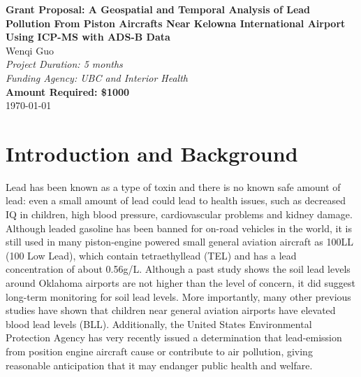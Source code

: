 \documentclass[12pt]{article}
\begin{document}
\begin{center}
    \Large{\textbf{Grant Proposal: A Geospatial and Temporal Analysis of Lead Pollution From Piston Aircrafts Near Kelowna International Airport Using ICP-MS with ADS-B Data}}\\
    \vspace{1cm}
    \large{Wenqi Guo}\\
    \vspace{0.5cm}
    \textit{Project Duration: 5 months}\\
    \vspace{0.5cm}
    \textit{Funding Agency: UBC and Interior Health}\\
    \vspace{0.5cm}
    \textbf{Amount Required: \$1000}\\
    \vspace{1cm}
    \vspace{1cm}
    \today
\end{center}
\newpage

\section{Introduction and Background}
Lead has been known as a type of toxin and there is no known safe amount of lead: even a small amount of lead could lead to health issues, such as decreased IQ in children, high blood pressure, cardiovascular problems and kidney damage. \cite{world_health_organization_lead_2023} Although leaded gasoline has been banned for on-road vehicles in the world, it is still used in many piston-engine powered small general aviation aircraft as 100LL (100 Low Lead), which contain tetraethyllead (TEL) and has a lead concentration of about 0.56g/L. 
\cite{noauthor_safety_2021} Although a past study shows the soil lead levels around Oklahoma airports are not higher than the level of concern, it did suggest long-term monitoring for soil lead levels. \cite{mccumber_geospatial_2017} More importantly, many other previous studies have shown that children near general aviation airports have elevated blood lead levels (BLL). \cite{miranda_geospatial_2011} \cite{zahran_leaded_2023} \cite{mills_lead_2022} \cite{zahran_effect_2017} Additionally, the United States Environmental Protection Agency has very recently issued a determination that lead-emission from position engine aircraft cause or contribute to air pollution, giving reasonable anticipation that it may endanger public health and welfare. \cite{us_epa_epa_2023}
\end{document}
